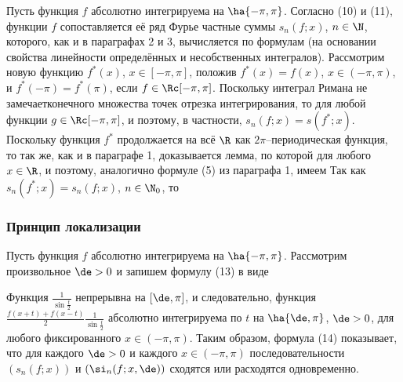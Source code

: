 \documentclass[a4paper]{article}
\begin{document}
Пусть функция $f$ абсолютно интегрируема на $\ha{-\pi,\pi}$.
Согласно (10) и (11), функции $f$ сопоставляется её ряд Фурье  частные суммы $s_n(f;x)$, $n\in\N$,
которого, как и в параграфах 2 и 3, вычисляется по формулам
(на основании свойства линейности определённых и несобственных
интегралов). Рассмотрим новую функцию $f^*(x)$, $x\in[-\pi,\pi]$,
положив $f^*(x)=f(x)$, $x\in(-\pi,\pi)$, и $f^*(-\pi) = f^*(\pi)$,
если $f\in\Rc[-\pi,\pi]$. Поскольку интеграл Римана не 
замечает конечного множества точек отрезка интегрирования, то
 для любой функции $g\in\Rc[-\pi,\pi]$, и поэтому, в
частности, $s_n(f;x) = s(f^*;x)$. Поскольку функция $f^*$
продолжается на всё $\R$ как $2\pi$--периодическая функция, то так
же, как и в параграфе 1, доказывается лемма, по которой
 для любого $x\in\R$, и поэтому, аналогично формуле (5)
из параграфа 1, имеем  Так как
$s_n(f^*;x) = s_n(f;x)$, $n\in\N_0$, то 

\subsubsection{Принцип локализации}

Пусть функция $f$ абсолютно интегрируема на $\ha{-\pi,\pi}$.
Рассмотрим произвольное $\de>0$ и запишем формулу (13) в виде

Функция $\frac1{\sin\frac{t}2}$ непрерывна на $[\de,\pi]$, и
следовательно, функция $\frac{f(x+t) + f(x-t)}2
\frac1{\sin\frac{t}2}$ абсолютно интегрируема по $t$ на
$\ha{\de,\pi}$, $\de>0$, для любого фиксированного $x\in(-\pi,\pi)$.
Таким образом, формула (14) показывает, что для каждого $\de>0$ и
каждого $x\in(-\pi,\pi)$ последовательности $(s_n(f;x))$ и
$(\si_n(f;x,\de))$ сходятся или расходятся одновременно.
\end{document}
